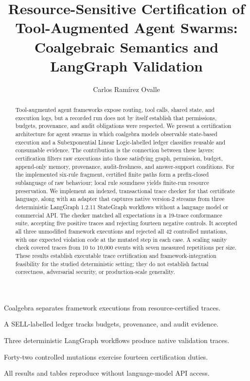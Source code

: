 \documentclass[a4paper,fleqn]{cas-sc}
\title[mode=title]{Resource-Sensitive Certification of Tool-Augmented Agent Swarms: Coalgebraic Semantics and LangGraph Validation}
\author[1]{Carlos Ram\'irez Ovalle}
\affiliation[1]{organization={Departamento de Ciencias Naturales y Matem\'aticas,
                Pontificia Universidad Javeriana-Cali},
            addressline={Calle 18 No. 118-250},
            city={Cali},
            country={Colombia}}
\begin{document}
\let\WriteBookmarks\relax
\def\floatpagepagefraction{1}
\def\textpagefraction{.001}

\begin{abstract}
Tool-augmented agent frameworks expose routing, tool calls, shared state, and
execution logs, but a recorded run does not by itself establish that
permissions, budgets, provenance, and audit obligations were respected. We
present a certification architecture for agent swarms in which coalgebra models
observable state-based execution and a Subexponential Linear Logic-labelled
ledger classifies reusable and consumable evidence. The contribution is the
connection between these layers: certification filters raw executions into
those satisfying graph, permission, budget, append-only memory, provenance,
audit-freshness, and answer-support conditions. For the implemented six-rule
fragment, certified finite paths form a prefix-closed
sublanguage of raw behaviour; local rule soundness yields finite-run resource
preservation. We implement an indexed, transactional trace checker for that
certificate language, along with an adapter that captures native version-2
streams from three deterministic
LangGraph 1.2.11 StateGraph workflows without a language model or commercial
API. The checker matched all expectations in a 19-trace conformance suite,
accepting five positive traces and rejecting fourteen negative controls. It
accepted all three unmodified framework executions and rejected all 42
controlled mutations, with one expected violation code at the mutated step in
each case. A scaling sanity check covered traces from 10 to 10,000 events with
seven measured repetitions per size. These results establish
executable trace certification and framework-integration feasibility for the
studied deterministic setting; they do not establish factual correctness,
adversarial security, or production-scale generality.
\end{abstract}

\begin{highlights}
\item Coalgebra separates framework executions from resource-certified traces.
\item A SELL-labelled ledger tracks budgets, provenance, and audit evidence.
\item Three deterministic LangGraph workflows produce native validation traces.
\item Forty-two controlled mutations exercise fourteen certification duties.
\item All results and tables reproduce without language-model API access.
\end{highlights}
\end{document}
